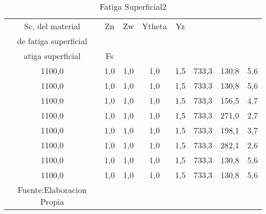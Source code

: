 
\begin{longtable}{|c|c|c|c|c|c|c|c|}
\hline
\rowcolor[HTML]{EFEFEF} 
Sc, del material & Zn  & Zw  & Ytheta & Yz  & \begin{tabular}[c]{@{}c@{}}Esfuerzo permisible\\  de fatiga superficial\end{tabular} & \begin{tabular}[c]{@{}c@{}}Esfuerzo AGMA f\\ atiga superficial\end{tabular} & Fs  \\ \hline
1100,0           & 1,0 & 1,0 & 1,0    & 1,5 & 733,3                                                                                & 130,8                                                                       & 5,6 \\ \hline
1100,0           & 1,0 & 1,0 & 1,0    & 1,5 & 733,3                                                                                & 130,8                                                                       & 5,6 \\ \hline
1100,0           & 1,0 & 1,0 & 1,0    & 1,5 & 733,3                                                                                & 156,5                                                                       & 4,7 \\ \hline
1100,0           & 1,0 & 1,0 & 1,0    & 1,5 & 733,3                                                                                & 271,0                                                                       & 2,7 \\ \hline
1100,0           & 1,0 & 1,0 & 1,0    & 1,5 & 733,3                                                                                & 198,1                                                                       & 3,7 \\ \hline
1100,0           & 1,0 & 1,0 & 1,0    & 1,5 & 733,3                                                                                & 282,1                                                                       & 2,6 \\ \hline
1100,0           & 1,0 & 1,0 & 1,0    & 1,5 & 733,3                                                                                & 130,8                                                                       & 5,6 \\ \hline
1100,0           & 1,0 & 1,0 & 1,0    & 1,5 & 733,3                                                                                & 130,8                                                                       & 5,6 \\ \hline

\caption{Fatiga Superficial2}{Fuente:Elaboracion Propia}
\label{table:fatiga_Superficial2}
\end{longtable}
